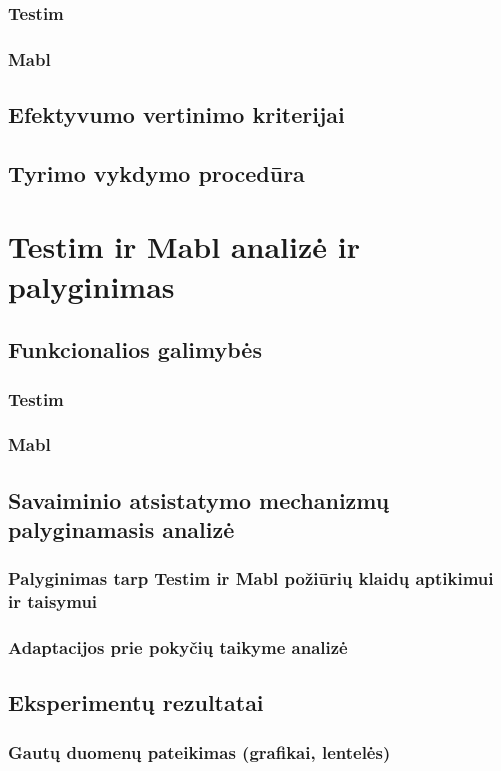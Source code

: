 \documentclass[
]{VUMIFPSkursinis}
\begin{document}
\subsubsection{Testim}
\subsubsection{Mabl}
\subsection{Efektyvumo vertinimo kriterijai}
\subsection{Tyrimo vykdymo procedūra}

\section{Testim ir Mabl analizė ir palyginimas}

\subsection{Funkcionalios galimybės}
\subsubsection{Testim}
\subsubsection{Mabl}
\subsection{Savaiminio atsistatymo mechanizmų palyginamasis analizė}
\subsubsection{Palyginimas tarp Testim ir Mabl požiūrių klaidų aptikimui ir taisymui}
\subsubsection{Adaptacijos prie pokyčių taikyme analizė}
\subsection{Eksperimentų rezultatai}
\subsubsection{Gautų duomenų pateikimas (grafikai, lentelės)}
\end{document}
